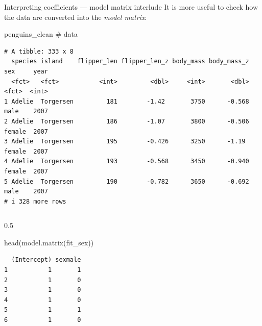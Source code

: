 \documentclass[
  10pt,
  ignorenonframetext,
  aspectratio=169,
  t]{beamer}
\newenvironment{Shaded}{\begin{snugshade}}{\end{snugshade}}
\newcommand{\CommentTok}[1]{\textcolor[rgb]{0.37,0.37,0.37}{#1}}
\newcommand{\FunctionTok}[1]{\textcolor[rgb]{0.28,0.35,0.67}{#1}}
\newcommand{\NormalTok}[1]{\textcolor[rgb]{0.00,0.23,0.31}{#1}}
\newcommand{\blueit}[1]{\textcolor{bluebeamer}{\emph{#1}}}
\begin{document}
\begin{frame}[fragile]{Interpreting coefficients --- model matrix
interlude}
\protect{}\label{interpreting-coefficients-model-matrix-interlude}
It is more useful to check how the data are converted into the
\blueit{model matrix}:

\footnotesize

\begin{Shaded}
\begin{Highlighting}[]
\NormalTok{penguins\_clean }\CommentTok{\# data}
\end{Highlighting}
\end{Shaded}

\begin{verbatim}
# A tibble: 333 x 8
  species island    flipper_len flipper_len_z body_mass body_mass_z sex     year
  <fct>   <fct>           <int>         <dbl>     <int>       <dbl> <fct>  <int>
1 Adelie  Torgersen         181        -1.42       3750      -0.568 male    2007
2 Adelie  Torgersen         186        -1.07       3800      -0.506 female  2007
3 Adelie  Torgersen         195        -0.426      3250      -1.19  female  2007
4 Adelie  Torgersen         193        -0.568      3450      -0.940 female  2007
5 Adelie  Torgersen         190        -0.782      3650      -0.692 male    2007
# i 328 more rows
\end{verbatim}

\normalsize

\begin{columns}[T]
\begin{column}{0.5\linewidth}
\footnotesize

\begin{Shaded}
\begin{Highlighting}[]
\FunctionTok{head}\NormalTok{(}\FunctionTok{model.matrix}\NormalTok{(fit\_sex))}
\end{Highlighting}
\end{Shaded}

\begin{verbatim}
  (Intercept) sexmale
1           1       1
2           1       0
3           1       0
4           1       0
5           1       1
6           1       0
\end{verbatim}

\normalsize
\end{column}


\end{columns}
\end{frame}
\end{document}
